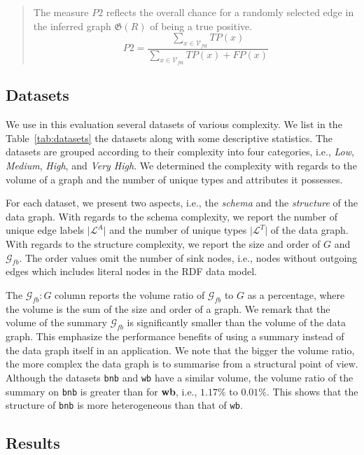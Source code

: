 \begin{quotation}
The measure $P2$ reflects the overall chance for a randomly selected edge in the inferred graph $\mathfrak{G}(R)$ of being a true positive.
$$
P2 = \frac{\sum_{x \in \mathcal{V}_{fbt}}{TP(x)}}{\sum_{x \in \mathcal{V}_{fbt}}{TP(x) + FP(x)}}
$$
\end{quotation}

\subsection{Datasets}
\label{sec:eval:datasets}

We use in this evaluation several datasets of various complexity. We list in the Table~\ref{tab:datasets} the datasets along with some descriptive statistics. The datasets are grouped according to their complexity into four categories, i.e., \emph{Low}, \emph{Medium}, \emph{High}, and \emph{Very High}. We determined the complexity with regards to the volume of a graph and the number of unique types and attributes it possesses.

For each dataset, we present two aspects, i.e., the \emph{schema} and the \emph{structure} of the data graph. With regards to the schema complexity, we report the number of unique edge labels $\vert \mathcal{L}^A \vert$ and the number of unique types $\vert \mathcal{L}^T \vert$ of the data graph. With regards to the structure complexity, we report the size and order of $G$ and  $\mathcal{G}_{fb}$. The order values omit the number of sink nodes, i.e., nodes without outgoing edges which includes literal nodes in the RDF data model.

The $\mathcal{G}_{fb}:G$ column reports the volume ratio of $\mathcal{G}_{fb}$ to $G$ as a percentage, where the volume is the sum of the size and order of a graph. We remark that the volume of the summary $\mathcal{G}_{fb}$ is significantly smaller than the volume of the data graph. This emphasize the performance benefits of using a summary instead of the data graph itself in an application. We note that the bigger the volume ratio, the more complex the data graph is to summarise from a structural point of view. Although the datasets \texttt{bnb} and \texttt{wb} have a similar volume, the volume ratio of the summary on \texttt{bnb} is greater than for \textbf{wb}, i.e., $1.17\%$ to $0.01\%$. This shows that the structure of \texttt{bnb} is more heterogeneous than that of \texttt{wb}.



\subsection{Results}
\label{sec:eval:results}

